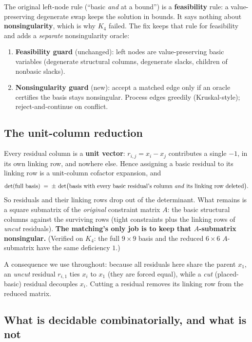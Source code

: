 \documentclass[11pt]{article}
\begin{document}
The original left-node rule (``basic \emph{and} at a bound'') is a
\textbf{feasibility} rule: a value-preserving degenerate swap keeps the solution
in bounds. It says nothing about \textbf{nonsingularity}, which is why $K_4$
failed. The fix keeps that rule for feasibility and adds a \emph{separate}
nonsingularity oracle:
\begin{enumerate}[nosep,label=(\roman*)]
  \item \textbf{Feasibility guard} (unchanged): left nodes are value-preserving
  basic variables (degenerate structural columns, degenerate slacks, children of
  nonbasic slacks).
  \item \textbf{Nonsingularity guard} (new): accept a matched edge only if an
  oracle certifies the basis stays nonsingular. Process edges greedily
  (Kruskal-style); reject-and-continue on conflict.
\end{enumerate}

\subsection{The unit-column reduction}

Every residual column is a \textbf{unit vector}: $r_{i,j}=x_i-x_j$ contributes a
single $-1$, in its own linking row, and nowhere else. Hence assigning a basic
residual to its linking row is a unit-column cofactor expansion, and
\[
\det(\text{full basis}) \;=\; \pm\,\det\bigl(\text{basis with every basic
residual's column \emph{and} its linking row deleted}\bigr).
\]
So residuals and their linking rows drop out of the determinant. What remains is
a square submatrix of the \emph{original} constraint matrix $A$: the basic
structural columns against the surviving rows (tight constraints plus the linking
rows of \emph{uncut} residuals). \textbf{The matching's only job is to keep that
$A$-submatrix nonsingular.} (Verified on $K_4$: the full $9\times9$ basis and the
reduced $6\times6$ $A$-submatrix have the same deficiency $1$.)

A consequence we use throughout: because all residuals here share the parent
$x_1$, an \emph{uncut} residual $r_{i,1}$ ties $x_i$ to $x_1$ (they are forced
equal), while a \emph{cut} (placed-basic) residual decouples $x_i$. Cutting a
residual removes its linking row from the reduced matrix.

\subsection{What is decidable combinatorially, and what is not}
\end{document}
